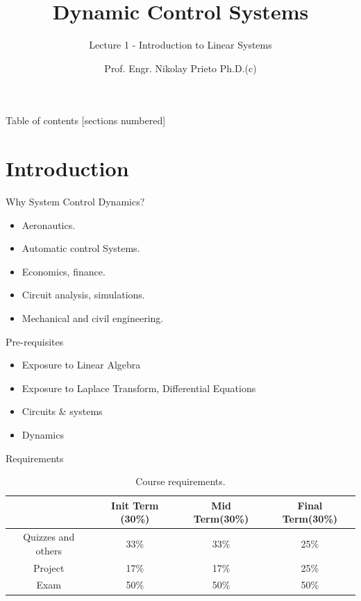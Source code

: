 \documentclass[10pt]{beamer}
\title{Dynamic Control Systems}
\subtitle{Lecture 1 - Introduction to Linear Systems}
\date{}
\author{Prof. Engr. Nikolay Prieto Ph.D.(c)}
\institute{Escuela Colombiana de Carreras Industriales - ECCI}
\begin{document}
\maketitle

\begin{frame}{Table of contents}
  [sections numbered]
  \tableofcontents[hideallsubsections]
\end{frame}

\section{Introduction}

\begin{frame}[fragile]{Why System Control Dynamics?}
  \begin{itemize}[<+- | alert@+>]
    \item Aeronautics.
    \item Automatic control Systems.
    \item Economics, finance.
    \item Circuit analysis, simulations.
    \item Mechanical and civil engineering.
  \end{itemize}
\end{frame}

\begin{frame}[fragile]{Pre-requisites}
    \begin{itemize}
        \item Exposure to Linear Algebra
        \item Exposure to Laplace Transform, Differential Equations
        \item Circuits \& systems
        \item Dynamics 
    \end{itemize}
\end{frame}

\begin{frame}{Requirements}
    
    \begin{table}
    \begin{centering}
    \begin{tabular}{|c|c|c|c|}
    \hline 
     & Init Term (30\%) & Mid Term(30\%) & Final Term(30\%)\tabularnewline
    \hline 
    \hline 
    Quizzes and others & 33\% & 33\% & 25\%\tabularnewline
    \hline 
    Project & 17\% & 17\% & 25\%\tabularnewline
    \hline 
    Exam & 50\% & 50\% & 50\%\tabularnewline
    \hline 
    \end{tabular}
    \par\end{centering}
    \caption{Course requirements.}
    \end{table}

\end{frame}
\end{document}
